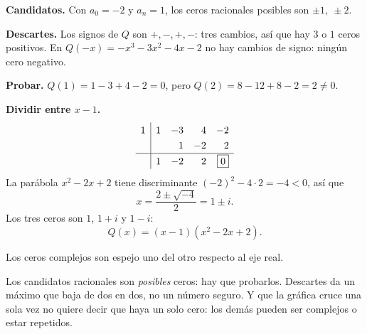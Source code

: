 \documentclass[11pt,a4paper]{article}
\begin{document}
\begin{ejemplo}
\textbf{Candidatos.} Con $a_0=-2$ y $a_n=1$, los ceros racionales posibles son $\pm1,\ \pm2$.\par
\textbf{Descartes.} Los signos de $Q$ son $+,-,+,-$: tres cambios, así que hay $3$ o $1$ ceros positivos.
En $Q(-x)=-x^3-3x^2-4x-2$ no hay cambios de signo: ningún cero negativo.\par
\textbf{Probar.} $Q(1)=1-3+4-2=0$, pero $Q(2)=8-12+8-2=2\neq0$.\par\smallskip
\begin{minipage}[c]{0.6\linewidth}
\textbf{Dividir entre $x-1$.}
\[
\renewcommand{\arraystretch}{1.3}
\begin{array}{c|rrrr}
1 & 1 & -3 & 4 & -2\\
  &   & 1 & -2 & 2\\ \hline
  & 1 & -2 & 2 & \fbox{$0$}
\end{array}
\]
La parábola $x^2-2x+2$ tiene discriminante $(-2)^2-4\cdot2=-4<0$, así que
\[ x=\frac{2\pm\sqrt{-4}}{2}=1\pm i . \]
Los tres ceros son $1$, $1+i$ y $1-i$:
\[ Q(x)=(x-1)\left(x^2-2x+2\right). \]
\end{minipage}\hfill
\begin{minipage}[c]{0.36\linewidth}\centering
{}

{\small\color{zmute}Los ceros complejos son espejo uno del otro respecto al eje real.}
\end{minipage}
\end{ejemplo}

\begin{ojo}
Los candidatos racionales son \emph{posibles} ceros: hay que probarlos. Descartes da un máximo que baja de dos en
dos, no un número seguro. Y que la gráfica cruce una sola vez no quiere decir que haya un solo cero: los demás
pueden ser complejos o estar repetidos.
\end{ojo}
\end{document}
